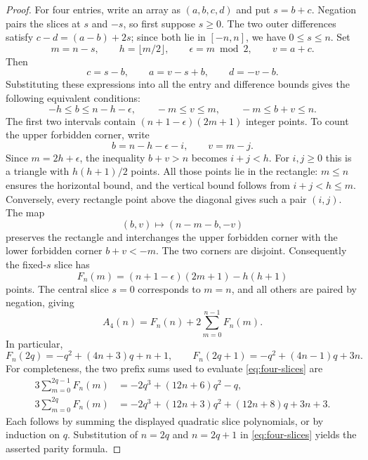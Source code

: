 \documentclass[11pt]{article}
\begin{document}
\begin{proof}
For four entries, write an array as $(a,b,c,d)$ and put $s=b+c$.
Negation pairs the slices at $s$ and $-s$, so first suppose $s\ge0$.
The two outer differences satisfy
$c-d=(a-b)+2s$; since both lie in $[-n,n]$, we have $0\le s\le n$.
Set
\[
 m=n-s,\qquad h=\lfloor m/2\rfloor,\qquad
 \epsilon=m\bmod2,\qquad v=a+c.
\]
Then
\[
 c=s-b,\qquad a=v-s+b,\qquad d=-v-b.
\]
Substituting these expressions into all the entry and difference
bounds gives the following equivalent conditions:
\begin{equation}\label{eq:four-rectangle}
 -h\le b\le n-h-\epsilon,\qquad
 -m\le v\le m,\qquad -m\le b+v\le n.
\end{equation}
The first two intervals contain
$(n+1-\epsilon)(2m+1)$ integer points. To count the upper forbidden
corner, write
\[
 b=n-h-\epsilon-i,\qquad v=m-j.
\]
Since $m=2h+\epsilon$, the inequality $b+v>n$ becomes $i+j<h$.
For $i,j\ge0$ this is a triangle with $h(h+1)/2$ points. All those
points lie in the rectangle: $m\le n$ ensures the horizontal bound,
and the vertical bound follows from $i+j<h\le m$. Conversely,
every rectangle point above the diagonal gives such a pair $(i,j)$.
The map
\[
 (b,v)\longmapsto(n-m-b,-v)
\]
preserves the rectangle and interchanges the upper forbidden corner
with the lower forbidden corner $b+v<-m$. The two corners are disjoint.
Consequently the fixed-$s$ slice has
\begin{equation}\label{eq:four-slice-polynomial}
 F_n(m)=(n+1-\epsilon)(2m+1)-h(h+1)
\end{equation}
points. The central slice $s=0$ corresponds to $m=n$, and all others
are paired by negation, giving
\begin{equation}\label{eq:four-slices}
 A_4(n)=F_n(n)+2\sum_{m=0}^{n-1}F_n(m).
\end{equation}
In particular,
\[
 F_n(2q)=-q^2+(4n+3)q+n+1,\qquad
 F_n(2q+1)=-q^2+(4n-1)q+3n.
\]
For completeness, the two prefix sums used to evaluate
\eqref{eq:four-slices} are
\begin{align*}
 3\sum_{m=0}^{2q-1}F_n(m)
   &=-2q^3+(12n+6)q^2-q,\\
 3\sum_{m=0}^{2q}F_n(m)
   &=-2q^3+(12n+3)q^2+(12n+8)q+3n+3.
\end{align*}
Each follows by summing the displayed quadratic slice polynomials,
or by induction on $q$. Substitution of $n=2q$ and $n=2q+1$ in
\eqref{eq:four-slices} yields the asserted parity formula.
\end{proof}
\end{document}
